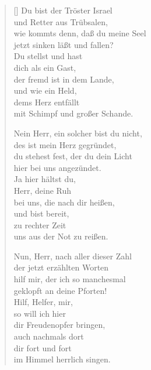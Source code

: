 \begin{multicols}{2}
\begin{verse}[\versewidth]
 Du bist der Tröster Israel\\
und Retter aus Trübsalen,\\
wie kommts denn, daß du meine Seel\\
jetzt sinken läßt und fallen?\\
Du stellst und hast\\
dich als ein Gast,\\
der fremd ist in dem Lande,\\
und wie ein Held,\\
dems Herz entfällt\\
mit Schimpf und großer Schande.

 Nein Herr, ein solcher bist du nicht,\\
des ist mein Herz gegründet,\\
du stehest fest, der du dein Licht\\
hier bei uns angezündet.\\
Ja hier hältst du,\\
Herr, deine Ruh\\
bei uns, die nach dir heißen,\\
und bist bereit,\\
zu rechter Zeit\\
uns aus der Not zu reißen.

 Nun, Herr, nach aller dieser Zahl\\
der jetzt erzählten Worten\\
hilf mir, der ich so manchesmal\\
geklopft an deine Pforten!\\
Hilf, Helfer, mir,\\
so will ich hier\\
dir Freudenopfer bringen,\\
auch nachmals dort\\
dir fort und fort\\
im Himmel herrlich singen.

\end{verse}
\end{multicols}
